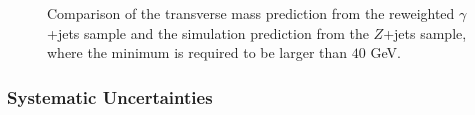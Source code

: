 \begin{figure}[!htbp]
\begin{center}
\caption{Comparison of the transverse mass prediction from the reweighted $\gamma$+jets sample 
and the simulation prediction from the $Z$+jets sample, where the minimum \met is required to be larger than 
$40$ GeV. }
\label{fig:PhotonJetsClosureTest_MtHZZ_MetPresel}
\end{center}
\end{figure}

%
%
\subsubsection{Systematic Uncertainties}

